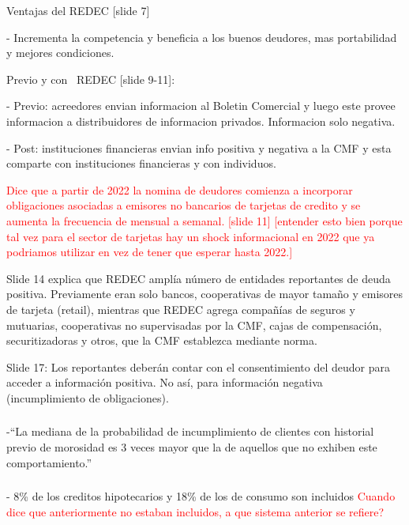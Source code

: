 \documentclass[12pt]{article}
\theoremstyle{plain}
\theoremstyle{plain}
\theoremstyle{definition}  %
\theoremstyle{remark}  %
\begin{document}
Ventajas del REDEC [slide 7]

- Incrementa la competencia y beneficia a los buenos deudores, mas portabilidad y mejores condiciones.
    

Previo y con  REDEC [slide 9-11]:

- Previo: acreedores envian informacion al Boletin Comercial y luego este provee informacion a distribuidores de informacion privados. Informacion solo negativa.
    
- Post: instituciones financieras envian info positiva y negativa a la CMF y esta comparte con instituciones financieras y con individuos.

\textcolor{red}{Dice que a partir de 2022 la nomina de deudores comienza a incorporar obligaciones asociadas a emisores no bancarios de tarjetas de credito y se aumenta la frecuencia de mensual a semanal. [slide 11] [entender esto bien porque tal vez para el sector de tarjetas hay un shock informacional en 2022 que ya podriamos utilizar en vez de tener que esperar hasta 2022.]}
    
Slide 14 explica que REDEC amplía número de entidades reportantes de deuda positiva. Previamente eran solo bancos, cooperativas de mayor tamaño y emisores de tarjeta (retail), mientras que REDEC agrega compañías de seguros y mutuarias, cooperativas no supervisadas por la CMF,  cajas de compensación, securitizadoras y otros, que la CMF establezca mediante  norma. 

Slide 17: Los reportantes deberán contar con el consentimiento del deudor para acceder a información positiva. No así, para información negativa (incumplimiento de obligaciones).


\subsubsection{\textcite{cowan_proyecto_2022}}

-“La mediana de la probabilidad de incumplimiento de clientes con historial previo de morosidad es 3 veces mayor que la de aquellos que no exhiben este comportamiento.” 


\subsubsection{\textcite{costa_proyecto_2022}}
- 8\% de los creditos hipotecarios y 18\% de los de consumo son incluidos   \textcolor{red}{Cuando dice que anteriormente no estaban incluidos, a que sistema anterior se refiere?}
\end{document}
